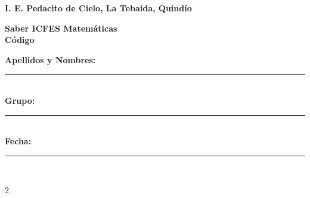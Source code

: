 \documentclass[10pt]{article}
\makeatletter
\renewcommand{\arraystretch}{0.7}
\let\oldtabular\tabular
\let\endoldtabular\endtabular
\renewenvironment{tabular}[1]{%
  \footnotesize                            %
  \setlength{\tabcolsep}{1.5pt}           %
  \renewcommand{\arraystretch}{0.8}       %
  \oldtabular{#1}
}{%
  \endoldtabular
}
\newcommand{\myID}{\@ID}
\newcommand{\myDate}{\@Date}
\makeatother
\begin{document}
\thispagestyle{empty}
{\sf
\textbf{\large{I. E. Pedacito de Cielo, La Tebaida, Quindío}}

\textbf{\large{Saber ICFES Matemáticas \myDate \hfill \\Código \myID}}

\vspace*{2cm}

\begin{tabular}{p{14cm}}
\textbf{Apellidos y Nombres:} \hrule \\[1.5cm]
\textbf{Grupo:} \hrule \\[1.5cm]
\textbf{Fecha:} \hrule  \\[1.5cm]
\end{tabular}

\vspace*{1cm}

}
\newpage

\begin{multicols}{2}

\begin{enumerate}


\end{enumerate}

\end{multicols}
\end{document}

